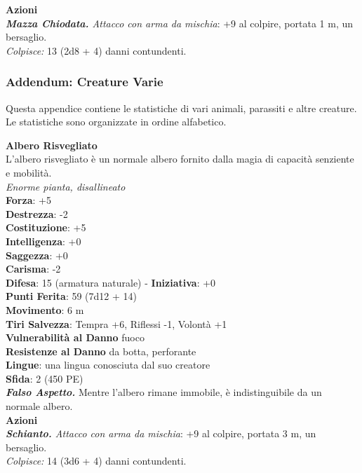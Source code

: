 \begin{multicols}{2}
\smallskip\textbf{Azioni}\\
\emph{\textbf{Mazza Chiodata.} Attacco con arma da mischia}: +9 al colpire, portata 1 m, un bersaglio.\\
\emph{Colpisce:} 13 (2d8 + 4) danni contundenti.\\

\vspace*{\fill}

\pagebreak

\subsubsection{Addendum: Creature Varie}

Questa appendice contiene le statistiche di vari animali, parassiti e altre creature. Le statistiche sono organizzate in ordine alfabetico.

\medskip\textbf{Albero Risvegliato}\\
L'albero risvegliato è un normale albero fornito dalla magia di capacità senziente e mobilità.\\
\emph{Enorme pianta, disallineato}\\
\textbf{Forza}: +5\\
\textbf{Destrezza}: -2\\
\textbf{Costituzione}: +5\\
\textbf{Intelligenza}: +0\\
\textbf{Saggezza}: +0\\
\textbf{Carisma}: -2\\
\textbf{Difesa}: 15 (armatura naturale) - \textbf{Iniziativa}: +0\\
\textbf{Punti Ferita}: 59 (7d12 + 14)\\
\textbf{Movimento}: 6 m\\
\textbf{Tiri Salvezza}: Tempra +6, Riflessi -1, Volontà +1\\
\textbf{Vulnerabilità al Danno} fuoco\\
\textbf{Resistenze al Danno} da botta, perforante\\
\textbf{Lingue}: una lingua conosciuta dal suo creatore\\
\textbf{Sfida}: 2 (450 PE)\smallskip\\
\emph{\textbf{Falso Aspetto.}} Mentre l'albero rimane immobile, è indistinguibile da un normale albero.\\
\smallskip\textbf{Azioni}\\
\emph{\textbf{Schianto.} Attacco con arma da mischia}: +9 al colpire, portata 3 m, un bersaglio.\\
\emph{Colpisce:} 14 (3d6 + 4) danni contundenti.\\


\end{multicols}
